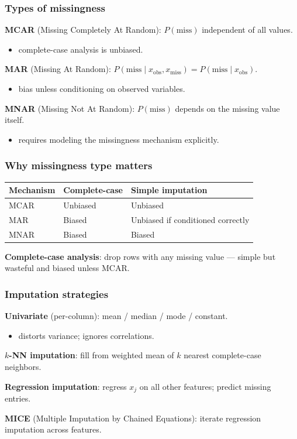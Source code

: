 \documentclass[]{beamer}
\begin{document}
\begin{frame}[fragile]
\frametitle{Types of missingness}
\textbf{MCAR} (Missing Completely At Random): $P(\text{miss}) $ independent of all values.
\begin{itemize}
  \item complete-case analysis is unbiased.
\end{itemize}

\textbf{MAR} (Missing At Random): $P(\text{miss} \mid x_\text{obs}, x_\text{miss}) = P(\text{miss} \mid x_\text{obs})$.
\begin{itemize}
  \item bias unless conditioning on observed variables.
\end{itemize}

\textbf{MNAR} (Missing Not At Random): $P(\text{miss})$ depends on the missing value itself.
\begin{itemize}
  \item requires modeling the missingness mechanism explicitly.
\end{itemize}

\end{frame}

\begin{frame}[fragile]
\frametitle{Why missingness type matters}
\begin{center}
\begin{tabular}{lp{3.2cm}p{3.2cm}}
\toprule
\textbf{Mechanism} & \textbf{Complete-case} & \textbf{Simple imputation} \\
\midrule
MCAR & Unbiased           & Unbiased \\
MAR  & Biased             & Unbiased if conditioned correctly \\
MNAR & Biased             & Biased \\
\bottomrule
\end{tabular}
\end{center}

\vspace{3mm}
\textbf{Complete-case analysis}: drop rows with any missing value --- simple but wasteful and biased unless MCAR.

\end{frame}

\begin{frame}[fragile]
\frametitle{Imputation strategies}
\textbf{Univariate} (per-column): mean / median / mode / constant.
\begin{itemize}
  \item distorts variance; ignores correlations.
\end{itemize}

\textbf{$k$-NN imputation}: fill from weighted mean of $k$ nearest complete-case neighbors.

\textbf{Regression imputation}: regress $x_j$ on all other features; predict missing entries.

\textbf{MICE} (Multiple Imputation by Chained Equations): iterate regression imputation across features.

\end{frame}
\end{document}
